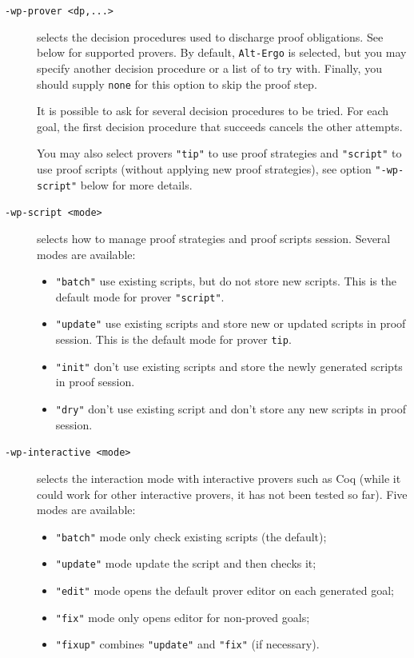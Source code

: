 \begin{description}
\item[\tt -wp-prover <dp,...>] selects the decision procedures used to
  discharge proof obligations. See below for supported provers.  By
  default, \texttt{Alt-Ergo} is selected, but you may specify another
  decision procedure or a list of to try with.  Finally, you should
  supply \texttt{none} for this option to skip the proof step.

  It is possible to ask for several decision procedures to be tried.
  For each goal, the first decision procedure that succeeds cancels the
  other attempts.

  You may also select provers \verb|"tip"| to use proof strategies and \verb|"script"| to use
  proof scripts (without applying new proof strategies),
  see option \verb|"-wp-script"| below for more details.
\item[\tt -wp-script <mode>] selects how to manage proof strategies and proof
  scripts session. Several modes are available:
  \begin{itemize}
  \item \texttt{"batch"} use existing scripts, but do not store new scripts.
    This is the default mode for prover \verb|"script"|.
  \item \texttt{"update"} use existing scripts and store new or updated scripts in proof session.
    This is the default mode for prover \verb|tip|.
  \item \texttt{"init"} don't use existing scripts and store the newly generated
    scripts in proof session.
  \item \texttt{"dry"} don't use existing script and don't store any new scripts in proof session.
  \end{itemize}
\item[\tt -wp-interactive <mode>] selects the interaction mode with
  interactive provers such as Coq (while it could work for other interactive
  provers, it has not been tested so far). Five modes are available:
  \begin{itemize}
  \item \texttt{"batch"} mode only check existing scripts (the default);
  \item \texttt{"update"} mode update the script and then checks it;
  \item \texttt{"edit"} mode opens the default prover editor on each generated goal;
  \item \texttt{"fix"} mode only opens editor for non-proved goals;
  \item \texttt{"fixup"} combines \texttt{"update"} and \texttt{"fix"} (if necessary).

\end{itemize}
\end{description}
